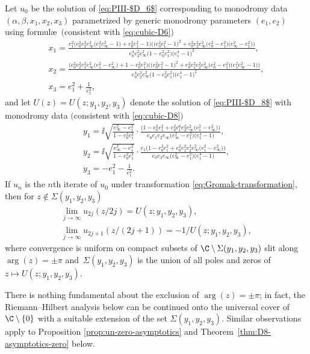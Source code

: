 \begin{Theorem}\label{thm:general}
 Let $u_0$ be the solution of \eqref{eq:PIII-$D_6$} corresponding to monodromy data $(\alpha, \beta, x_1, x_2, x_3)$ parametrized by generic monodromy parameters $(e_1,e_2)$ using formul\ae\ $($consistent with \eqref{eq:cubic-D6}$)$
 \begin{gather}%
 x_1=
 \frac{e_1^2 \big(e_0^2 e_2^2e_\infty^2 \big(e_1^2 e_\infty^2-1\big)+e_0^2 e_1^2-1\big)\big(\big(e_0^2 e_1^2-1\big)^2 + e_0^2e_2^2e_\infty^2 \big(e_0^2-e_1^2\big) \big(e_\infty^2-e_1^2\big)\big)}{e_0^4 e_2^2e_\infty^2\big(1-e_0^2 e_1^2\big)\big(e_1^4-1\big)^2 },\label{eq:x1}
\\
 x_2= \frac{\big(e_0^2 e_2^2 e_1^2e_\infty^2 \big(e_1^2-e_\infty^2\big)+1-e_0^2 e_1^2\big) \big(\big(e_0^2 e_1^2-1\big)^2\!+e_0^2 e_1^2e_2^2 e_\infty^2 \big(e_0^2-e_1^2\big) \big(e_1^2 e_\infty^2\!-1\big)\big)}{e_0^4e_2^2e_\infty^2 \big(1-e_0^2 e_1^2\big) \big(e_1^4-1\big)^2 }, \!\!\!\!
\\
 x_3=
 e_1^2+\frac{1}{e_1^2},\label{eq:x3}
\end{gather}
and let $U(z)=U(z;y_1,y_2,y_3)$ denote the solution of \eqref{eq:PIII-$D_8$} with monodromy data $($consistent with \eqref{eq:cubic-D8}$)$
 \begin{gather}
 y_1 = \ii\sqrt{\frac{e_\infty^2-e_1^2}{1-e_0^2 e_1^2}} \cdot\frac{ \big(1-e_0^2 e_1^2+e_0^2e_1^6e_2^2e_
 \infty^2\big(e_1^2-e_\infty^2\big)\big)}{e_0 e_1 e_2 e_\infty\big( e_\infty^2-e_1^2\big) \big(e_1^4-1\big) },
 \label{eq:y1}
\\
 y_2 = \ii\sqrt{\frac{e_\infty^2-e_1^2}{1-e_0^2 e_1^2}} \cdot\frac{e_1 \big(1-e_0^2 e_1^2+e_0^2e_1^2e_2^2e_
 \infty^2\big(e_1^2-e_\infty^2\big)\big)}{e_0e_2 e_\infty \big( e_\infty^2-e_1^2\big) \big(e_1^4-1\big)},
 \label{eq:y2}
 \\
 y_3 = -e_1^2-\frac{1}{e_1^2}.
 \label{eq:y3}
 \end{gather}
If $u_n$ is the $n$th iterate of $u_0$ under transformation \eqref{eq:Gromak-transformation}, then for $z\notin \Sigma(y_1,y_2,y_3)$
 \begin{gather*}
 \lim_{j \to \infty} u_{2j}(z/2j) = U(z;y_1,y_2,y_3),\\ \lim_{j \to \infty} u_{2j+1}(z/(2j+1)) = -1/U(z;y_1,y_2,y_3),
 \end{gather*}
where convergence is uniform on compact subsets of $\C\setminus \Sigma(y_1, y_2, y_3)$ slit along $\arg(z)= \pm \pi$ and~$\Sigma(y_1,y_2,y_3)$ is the union of all poles and zeros of $z\mapsto U(z;y_1,y_2,y_3)$.
\end{Theorem}
There is nothing fundamental about the exclusion of $\arg(z) = \pm \pi$; in fact, the Riemann--Hilbert analysis below can be continued onto the universal cover of $\C \setminus \{0\}$ with a suitable extension of the set $\Sigma(y_1, y_2, y_3)$. Similar observations apply to Proposition \ref{prop:un-zero-asymptotics} and Theorem~\ref{thm:D8-asymptotics-zero} below.

